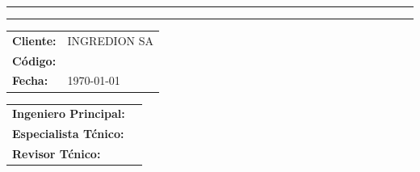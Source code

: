 \thispagestyle{corporativo}

\begingroup
\centering
\vspace*{1cm}

{\Large\bfseries \documenttype}

\vspace{0.6cm}
\rule{\linewidth}{0.4pt}

\vspace{0.4cm}
{\huge\bfseries \projecttitle}

\vspace{0.4cm}
\rule{\linewidth}{0.4pt}

\vspace{1cm}

\begin{table}[H]
	\raggedright
	\renewcommand{\arraystretch}{1.3}
	\begin{tabular}{@{}ll@{}}
		\toprule[1.5pt]
		\textbf{Cliente:} & INGREDION SA \\
		\textbf{C\'odigo:} & \documentcode \\
		\textbf{Fecha:} & \today \\
		\bottomrule[1.5pt]
	\end{tabular}
\end{table}

\vspace{0.5cm}

\begin{table}[H]
	\raggedright
	\renewcommand{\arraystretch}{1.3}
	\begin{tabular}{@{}ll@{}}
		\toprule[1.5pt]
		\textbf{Ingeniero Principal:} & \firmaAprobo \\
		\textbf{Especialista T\'cnico:} & \firmaElaboro \\
		\textbf{Revisor T\'cnico:} & \firmaReviso \\
		\bottomrule[1.5pt]
	\end{tabular}
\end{table}

\vfill

